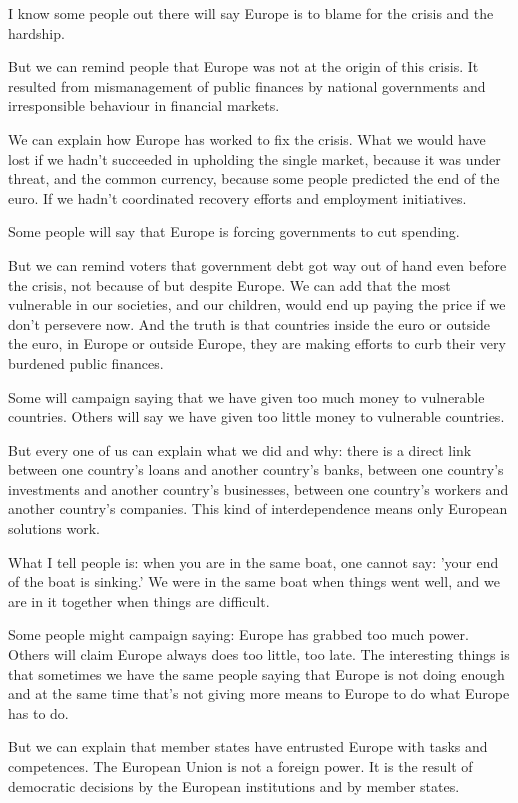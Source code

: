 \documentclass[a4paper,11pt]{article}
\begin{document}
I know some people out there will say Europe is to blame for the crisis and the hardship.

But we can remind people that Europe was not at the origin of this crisis. It resulted from mismanagement of public finances by national governments and irresponsible behaviour in financial markets.

We can explain how Europe has worked to fix the crisis. What we would have lost if we hadn't succeeded in upholding the single market, because it was under threat, and the common currency, because some people predicted the end of the euro. If we hadn't coordinated recovery efforts and employment initiatives.

Some people will say that Europe is forcing governments to cut spending.

But we can remind voters that government debt got way out of hand even before the crisis, not because of but despite Europe. We can add that the most vulnerable in our societies, and our children, would end up paying the price if we don't persevere now. And the truth is that countries inside the euro or outside the euro, in Europe or outside Europe, they are making efforts to curb their very burdened public finances.

Some will campaign saying that we have given too much money to vulnerable countries. Others will say we have given too little money to vulnerable countries.

But every one of us can explain what we did and why: there is a direct link between one country's loans and another country's banks, between one country's investments and another country's businesses, between one country's workers and another country's companies. This kind of interdependence means only European solutions work.

What I tell people is: when you are in the same boat, one cannot say: 'your end of the boat is sinking.' We were in the same boat when things went well, and we are in it together when things are difficult.

Some people might campaign saying: Europe has grabbed too much power. Others will claim Europe always does too little, too late. The interesting things is that sometimes we have the same people saying that Europe is not doing enough and at the same time that's not giving more means to Europe to do what Europe has to do.

But we can explain that member states have entrusted Europe with tasks and competences. The European Union is not a foreign power. It is the result of democratic decisions by the European institutions and by member states.
\end{document}

